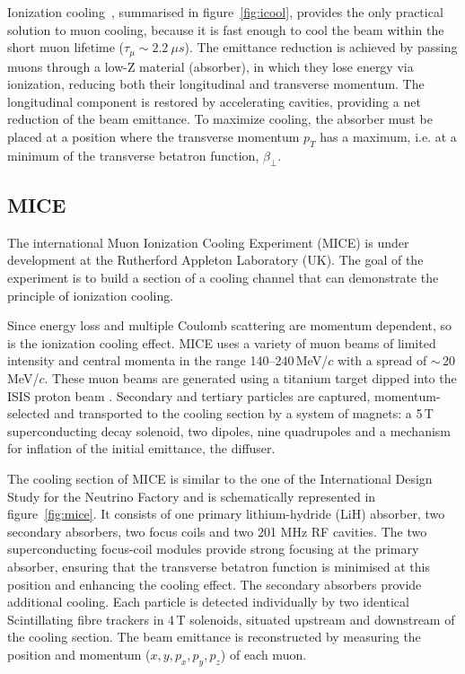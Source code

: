 \documentclass[a4paper,11pt]{article}
\begin{document}
Ionization cooling~\cite{icool1}, summarised in figure~\ref{fig:icool}, provides the only practical solution to muon cooling,
because it is fast enough to cool the beam within the short muon lifetime ($\tau_\mu \sim 2.2 \ \mu s$). The emittance reduction is
achieved by passing muons through a low-Z material (absorber), in which they
lose energy via ionization, reducing both their longitudinal and transverse momentum. The
longitudinal component is restored by accelerating cavities, providing a net reduction of the beam emittance. To
maximize cooling, the absorber must be placed at a position where the transverse momentum $p_T$ has a maximum, i.e. at a minimum of
the transverse betatron function, $\beta_{\perp}$.

\subsection{MICE}
The international Muon Ionization Cooling Experiment (MICE) \cite{MICEweb} is under development at the Rutherford Appleton
Laboratory (UK). The goal of the experiment is to build a section of a cooling channel that can demonstrate the principle
of ionization cooling.

Since energy loss and multiple Coulomb scattering are momentum dependent, so is the ionization cooling effect. MICE uses a variety of muon beams of limited intensity and central momenta in the
range 140--240\,MeV/$c$ with a spread of $\sim$\,20\,MeV/$c$. These muon beams are generated using a titanium target
\cite{target} dipped into the ISIS proton beam \cite{isis}. Secondary and tertiary particles are captured,
momentum-selected and transported to the cooling section by a system of magnets: a 5\,T superconducting
decay solenoid, two dipoles, nine quadrupoles and a mechanism for inflation of the initial emittance, the diffuser.

The cooling section of MICE is similar to the one of the International Design Study
for the Neutrino Factory and is schematically represented in figure~\ref{fig:mice}. It consists of one primary lithium-hydride (LiH) absorber, two secondary absorbers,
two focus coils and two 201 MHz RF cavities. The two superconducting focus-coil modules provide strong focusing at the primary
absorber, ensuring that the transverse betatron function is minimised at this position and enhancing the cooling effect. The secondary absorbers provide additional cooling. 
Each particle is detected individually by two identical Scintillating fibre trackers in 4\,T
solenoids, situated upstream and downstream of the cooling section. The beam emittance is reconstructed by measuring the
position and momentum ($x,y,p_x,p_y,p_z$) of each muon.
\end{document}
